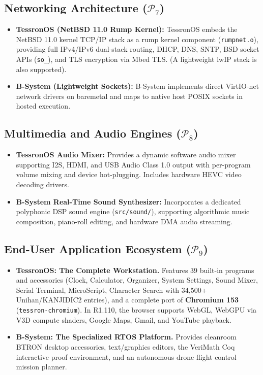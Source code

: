 \documentclass[10pt,journal,compsoc,twocolumn]{article}
\begin{document}
\subsection{Networking Architecture ($\mathcal{P}_7$)}
\begin{itemize}[leftmargin=*]
    \item \textbf{TessronOS (NetBSD 11.0 Rump Kernel):} TessronOS embeds the NetBSD 11.0 kernel TCP/IP stack as a rump kernel component (\texttt{rumpnet.o}), providing full IPv4/IPv6 dual-stack routing, DHCP, DNS, SNTP, BSD socket APIs (\texttt{so\_}), and TLS encryption via Mbed TLS. (A lightweight lwIP stack is also supported).
    \item \textbf{B-System (Lightweight Sockets):} B-System implements direct VirtIO-net network drivers on baremetal and maps to native host POSIX sockets in hosted execution.
\end{itemize}

\subsection{Multimedia and Audio Engines ($\mathcal{P}_8$)}
\begin{itemize}[leftmargin=*]
    \item \textbf{TessronOS Audio Mixer:} Provides a dynamic software audio mixer supporting I2S, HDMI, and USB Audio Class 1.0 output with per-program volume mixing and device hot-plugging. Includes hardware HEVC video decoding drivers.
    \item \textbf{B-System Real-Time Sound Synthesizer:} Incorporates a dedicated polyphonic DSP sound engine (\texttt{src/sound/}), supporting algorithmic music composition, piano-roll editing, and hardware DMA audio streaming.
\end{itemize}

\subsection{End-User Application Ecosystem ($\mathcal{P}_9$)}
\begin{itemize}[leftmargin=*]
    \item \textbf{TessronOS: The Complete Workstation.} Features 39 built-in programs and accessories (Clock, Calculator, Organizer, System Settings, Sound Mixer, Serial Terminal, MicroScript, Character Search with 34,500+ Unihan/KANJIDIC2 entries), and a complete port of \textbf{Chromium 153} (\texttt{tessron-chromium}). In R1.110, the browser supports WebGL, WebGPU via V3D compute shaders, Google Maps, Gmail, and YouTube playback.
    \item \textbf{B-System: The Specialized RTOS Platform.} Provides cleanroom BTRON desktop accessories, text/graphics editors, the VeriMath Coq interactive proof environment, and an autonomous drone flight control mission planner.
\end{itemize}
\end{document}
